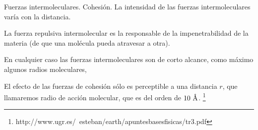 \begin{myblock}{Fuerzas intermoleculares. Cohesión.}
\vspace{2mm} La intensidad de las fuerzas intermoleculares varía con la distancia. 

\vspace{2mm} La fuerza repulsiva intermolecular es la responsable de la impenetrabilidad de la materia (de que una molécula pueda atravesar a otra). 

\vspace{2mm} En cualquier caso las fuerzas intermoleculares son de corto alcance, como máximo algunos radios moleculares, 

\vspace{2mm} El efecto de las fuerzas de cohesión sólo es perceptible a una distancia $r$, que llamaremos radio de acción molecular, que es del orden de $10 \ \textup{\r{A}}$. 
\footnote{http://www.ugr.es/~esteban/earth/apuntesbasesfisicas/tr3.pdf}
	
\end{myblock}















